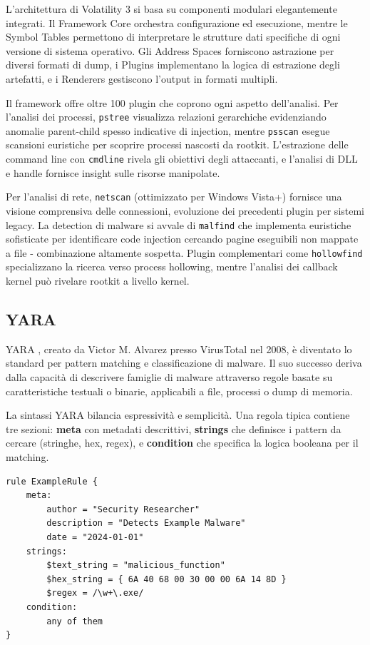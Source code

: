 L'architettura di Volatility 3 si basa su componenti modulari elegantemente integrati. Il Framework Core orchestra configurazione ed esecuzione, mentre le Symbol Tables permettono di interpretare le strutture dati specifiche di ogni versione di sistema operativo. Gli Address Spaces forniscono astrazione per diversi formati di dump, i Plugins implementano la logica di estrazione degli artefatti, e i Renderers gestiscono l'output in formati multipli.

Il framework offre oltre 100 plugin che coprono ogni aspetto dell'analisi. Per l'analisi dei processi, \texttt{pstree} visualizza relazioni gerarchiche evidenziando anomalie parent-child spesso indicative di injection, mentre \texttt{psscan} esegue scansioni euristiche per scoprire processi nascosti da rootkit. L'estrazione delle command line con \texttt{cmdline} rivela gli obiettivi degli attaccanti, e l'analisi di DLL e handle fornisce insight sulle risorse manipolate.

Per l'analisi di rete, \texttt{netscan} (ottimizzato per Windows Vista+) fornisce una visione comprensiva delle connessioni, evoluzione dei precedenti plugin per sistemi legacy. La detection di malware si avvale di \texttt{malfind} che implementa euristiche sofisticate per identificare code injection cercando pagine eseguibili non mappate a file - combinazione altamente sospetta. Plugin complementari come \texttt{hollowfind} specializzano la ricerca verso process hollowing, mentre l'analisi dei callback kernel può rivelare rootkit a livello kernel.

\subsection{YARA}

YARA \cite{yara2024}, creato da Victor M. Alvarez presso VirusTotal nel 2008, è diventato lo standard per pattern matching e classificazione di malware. Il suo successo deriva dalla capacità di descrivere famiglie di malware attraverso regole basate su caratteristiche testuali o binarie, applicabili a file, processi o dump di memoria.

La sintassi YARA bilancia espressività e semplicità. Una regola tipica contiene tre sezioni: \textbf{meta} con metadati descrittivi, \textbf{strings} che definisce i pattern da cercare (stringhe, hex, regex), e \textbf{condition} che specifica la logica booleana per il matching. 

\begin{verbatim}
rule ExampleRule {
    meta:
        author = "Security Researcher"
        description = "Detects Example Malware"
        date = "2024-01-01" 
    strings:
        $text_string = "malicious_function"
        $hex_string = { 6A 40 68 00 30 00 00 6A 14 8D }
        $regex = /\w+\.exe/
    condition:
        any of them
}
\end{verbatim}

